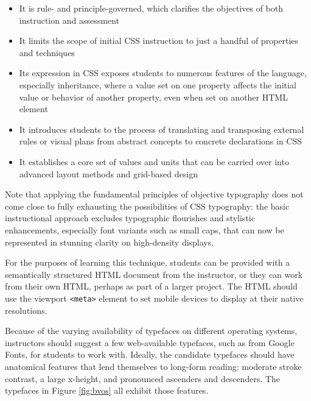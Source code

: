 \documentclass[sigplan,screen]{acmart}
\begin{document}
\begin{itemize}
  \item It is rule- and principle-governed, which clarifies the objectives of both instruction and assessment
  \item It limits the scope of initial CSS instruction to just a handful of properties and techniques
  \item Its expression in CSS exposes students to numerous features of the language, especially inheritance, where a value set on one property affects the initial value or behavior of another property, even when set on another HTML element
  \item It introduces students to the process of translating and transposing external rules or visual plans from abstract concepts to concrete declarations in CSS
  \item It establishes a core set of values and units that can be carried over into advanced layout methods and grid-based design
\end{itemize}

Note that applying the fundamental principles of objective typography does not come close to fully exhausting the possibilities of CSS typography: the basic instructional approach excludes typographic flourishes and stylistic enhancements, especially font variants such as small caps, that can now be represented in stunning clarity on high-density displays.

For the purposes of learning this technique, students can be provided with a semantically structured HTML document from the instructor, or they can work from their own HTML, perhaps as part of a larger project. The HTML should use the viewport \verb|<meta>| element to set mobile devices to display at their native resolutions.

Because of the varying availability of typefaces on different operating systems, instructors should suggest a few web-available typefaces, such as from Google Fonts, for students to work with. Ideally, the candidate typefaces should have anatomical features that lend themselves to long-form reading: moderate stroke contrast, a large x-height, and pronounced ascenders and descenders. The typefaces in Figure \ref{fig:bvos} all exhibit those features.
\end{document}
